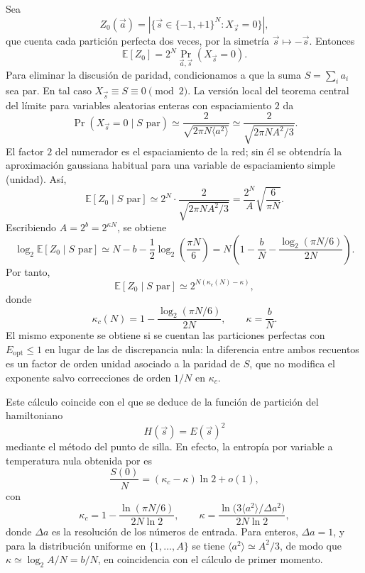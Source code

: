 Sea
\[
Z_0(\vec{a})
=|\{\vec{s}\in\{-1,+1\}^N : X_{\vec{s}}=0\}|,
\]
que cuenta cada partición perfecta dos veces, por la simetría $\vec{s}\mapsto-\vec{s}$. Entonces
\[
\mathbb{E}[Z_0]
=2^N\Pr_{\vec{a},\vec{s}}(X_{\vec{s}}=0).
\]
Para eliminar la discusión de paridad, condicionamos a que la suma $S=\sum_i a_i$ sea par. En tal caso $X_{\vec{s}}\equiv S\equiv 0\pmod 2$. La versión local del teorema central del límite para variables aleatorias enteras con espaciamiento $2$ da
\[
\Pr(X_{\vec{s}}=0\mid S\text{ par})
\simeq
\frac{2}{\sqrt{2\pi N\langle a^2\rangle}}
\simeq
\frac{2}{\sqrt{2\pi N A^2/3}}.
\]
El factor $2$ del numerador es el espaciamiento de la red; sin él se obtendría la aproximación gaussiana habitual para una variable de espaciamiento simple (unidad). Así,
\[
\mathbb{E}[Z_0\mid S\text{ par}]
\simeq
2^N\cdot
\frac{2}{\sqrt{2\pi N A^2/3}}
=
\frac{2^N}{A}
\sqrt{\frac{6}{\pi N}}.
\]
Escribiendo $A=2^b=2^{\kappa N}$, se obtiene
\[
\log_2 \mathbb{E}[Z_0\mid S\text{ par}]
\simeq
N-b-\frac12\log_2\!\left(\frac{\pi N}{6}\right)
=
N\left(
1-\frac{b}{N}
-\frac{\log_2(\pi N/6)}{2N}
\right).
\]
Por tanto,
\[
\mathbb{E}[Z_0\mid S\text{ par}]
\simeq
2^{N(\kappa_c(N)-\kappa)},
\]
donde
\begin{equation}
	\kappa_c(N) = 1 - \frac{\log_2(\pi N/6)}{2N},
	\qquad
	\kappa=\frac{b}{N}.
	\label{eq:bg-kappa-c}
\end{equation}
El mismo exponente se obtiene si se cuentan las particiones perfectas con $E_{\mathrm{opt}}\le 1$ en lugar de las de discrepancia nula: la diferencia entre ambos recuentos es un factor de orden unidad asociado a la paridad de $S$, que no modifica el exponente salvo correcciones de orden $1/N$ en $\kappa_c$.

Este cálculo coincide con el que se deduce de la función de partición del hamiltoniano
\[
H(\vec{s})=E(\vec{s})^2
\]
mediante el método del punto de silla. En efecto, la entropía por variable a temperatura nula obtenida por \textcite{mertens1998,mertens2001} es
\[
\frac{S(0)}{N}
=
(\kappa_c-\kappa)\ln 2+o(1),
\]
con
\[
\kappa_c
=
1-\frac{\ln(\pi N/6)}{2N\ln 2},
\qquad
\kappa
=
\frac{\ln\!\bigl(3\langle a^2\rangle/\Delta a^2\bigr)}{2N\ln 2},
\]
donde $\Delta a$ es la resolución de los números de entrada. Para enteros, $\Delta a=1$, y para la distribución uniforme en $\{1,\ldots,A\}$ se tiene $\langle a^2\rangle\simeq A^2/3$, de modo que $\kappa\simeq \log_2 A/N=b/N$, en coincidencia con el cálculo de primer momento.

